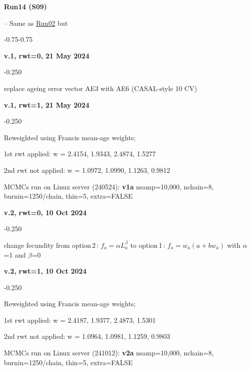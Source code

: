 \hypertarget{R14}{\textbf{Run14 (S09)}} -- Same as \hyperlink{R02}{Run02} but
\begin{itemize_csas}{-0.75}{-0.75}
	\item \textbf{v.1, rwt=0, 21 May 2024}
	\begin{itemize_csas}{-0.25}{0}
		\item replace ageing error vector AE3 with AE6 (CASAL-style 10\pc{} CV)
	\end{itemize_csas}
	\item \textbf{v.1, rwt=1, 21 May 2024}
	\begin{itemize_csas}{-0.25}{0}
		\item Reweighted using Francis mean-age weights;
		\item 1st rwt applied: w = 2.4154, 1.9343, 2.4874, 1.5277
		\item 2nd rwt not applied: w = 1.0972, 1.0990, 1.1263, 0.9812
		\item MCMCs run on Linux server (240524): \textbf{v1a} nsamp=10,000, nchain=8, burnin=1250/chain, thin=5, extra=FALSE
	\end{itemize_csas}
	\item \textbf{v.2, rwt=0, 10 Oct 2024}
	\begin{itemize_csas}{-0.25}{0}
		\item change fecundity from option\,2\,: $f_a = \alpha L_a^{\beta}$ to option\,1\,:  $f_a = w_a (a + b w_a)$ with $\alpha$=1 and $\beta$=0
	\end{itemize_csas}
	\item \textbf{v.2, rwt=1, 10 Oct 2024}
	\begin{itemize_csas}{-0.25}{0}
		\item Reweighted using Francis mean-age weights;
		\item 1st rwt applied: w = 2.4187, 1.9377, 2.4873, 1.5301
		\item 2nd rwt not applied: w = 1.0964, 1.0981, 1.1259, 0.9803
		\item MCMCs run on Linux server (241012): \textbf{v2a} nsamp=10,000, nchain=8, burnin=1250/chain, thin=5, extra=FALSE
	\end{itemize_csas}
\end{itemize_csas}

